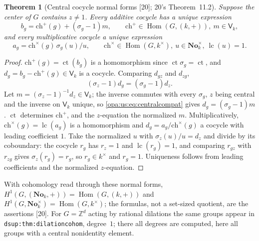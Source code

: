 \documentclass[11pt,oneside]{article}
\numberwithin{equation}{section}
\newtheorem{theorem}{Theorem}[section]
\theoremstyle{definition}
\theoremstyle{remark}
\newcommand{\No}{\mathbf{No}}
\newcommand{\Z}{\mathbb Z}
\newcommand{\Hom}{\operatorname{Hom}}
\newcommand{\lc}{\operatorname{lc}}
\newcommand{\ct}{\operatorname{ct}}
\newcommand{\src}[1]{\textup{\textsf{\small[#1]}}}
\newcommand{\lbl}[1]{\nolinkurl{#1}}
\begin{document}
\begin{theorem}[Central cocycle normal forms \src{20}; 20's Theorem~11.2]\label{opa:us:thm:cocycles}
Suppose the center of $G$ contains $z\ne1$. Every additive cocycle has a unique expression
\begin{equation}\label{opa:us:eq:additivecocycle}
 b_g=\mathrm{ch}^+(g)+(\sigma_g-1)m,\qquad \mathrm{ch}^+\in\Hom(G,(k,+)),\ m\in\mathsf V_k,
\end{equation}
and every multiplicative cocycle a unique expression
\begin{equation}\label{opa:us:eq:multcocycle}
 a_g=\mathrm{ch}^\times(g)\,\sigma_g(u)/u,\qquad \mathrm{ch}^\times\in\Hom(G,k^\times),\ u\in\No_k^\times,\ \lc(u)=1 .
\end{equation}
\end{theorem}
\begin{proof}
$\mathrm{ch}^+(g)=\ct(b_g)$ is a homomorphism since $\ct\sigma_g=\ct$, and $d_g=b_g-\mathrm{ch}^+(g)\in\mathsf V_k$ is a cocycle. Comparing $d_{gz}$ and $d_{zg}$,
\begin{equation}\label{opa:us:eq:centralcompat}
 (\sigma_z-1)d_g=(\sigma_g-1)d_z .
\end{equation}
Let $m=(\sigma_z-1)^{-1}d_z\in\mathsf V_k$; the inverse commutes with every $\sigma_g$, $z$ being central and the inverse on $\mathsf V_k$ unique, so
\eqref{opa:us:eq:centralcompat} gives $d_g=(\sigma_g-1)m$. $\ct$ determines $\mathrm{ch}^+$, and the $z$-equation the normalized $m$. Multiplicatively, $\mathrm{ch}^\times(g)=\lc(a_g)$ is a
homomorphism and $d_g=a_g/\mathrm{ch}^\times(g)$ a cocycle with leading coefficient $1$. Take the normalized $u$ with $\sigma_z(u)/u=d_z$ and divide by its coboundary: the
cocycle $r_g$ has $r_z=1$ and $\lc(r_g)=1$, and comparing $r_{gz}$ with $r_{zg}$ gives $\sigma_z(r_g)=r_g$, so $r_g\in k^\times$ and $r_g=1$. Uniqueness follows from
leading coefficients and the normalized $z$-equation.
\end{proof}

With cohomology read through these normal forms, $H^1(G,(\No_k,+))=\Hom(G,(k,+))$ and $H^1(G,\No_k^\times)=\Hom(G,k^\times)$; the formulas, not a set-sized
quotient, are the assertions \src{20}. For $G=\Z^d$ acting by rational dilations the same groups appear in \lbl{dsup:thm:dilationcohom}, degree~$1$;
there all degrees are computed, here all groups with a central nonidentity element.
\end{document}
